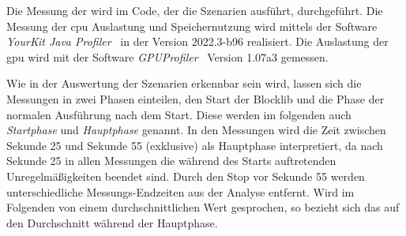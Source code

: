 Die Messung der \si{\fps} wird im Code, der die Szenarien ausführt, durchgeführt. Die Messung der \ac{cpu} Auslastung und Speichernutzung wird mittels der Software \emph{YourKit Java Profiler}~\cite{YourKitGmbH} in der Version 2022.3-b96 realisiert. Die Auslastung der \ac{gpu} wird mit der Software \emph{GPUProfiler}~\cite{Main2021} Version 1.07a3 gemessen. 

Wie in der Auswertung der Szenarien erkennbar sein wird, lassen sich die Messungen in zwei Phasen einteilen, den Start der Blocklib und die Phase der normalen Ausführung nach dem Start. Diese werden im folgenden auch \emph{Startphase} und \emph{Hauptphase} genannt. In den Messungen wird die Zeit zwischen Sekunde 25 und Sekunde 55 (exklusive) als Hauptphase interpretiert, da nach Sekunde 25 in allen Messungen die während des Starts auftretenden Unregelmäßigkeiten beendet sind. Durch den Stop vor Sekunde 55 werden unterschiedliche Messungs-Endzeiten aus der Analyse entfernt. Wird im Folgenden von einem durchschnittlichen Wert gesprochen, so bezieht sich das auf den Durchschnitt während der Hauptphase.
